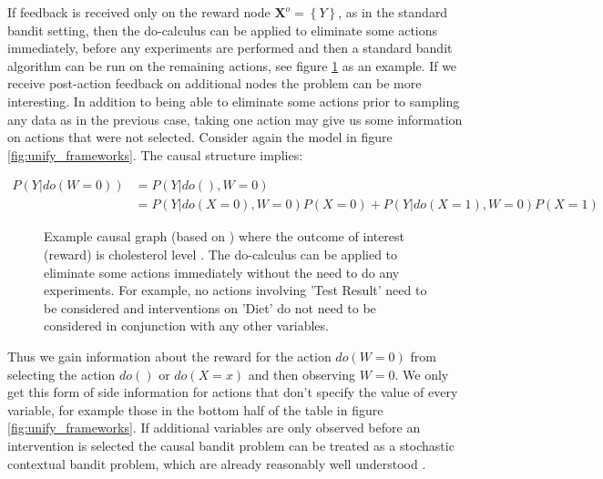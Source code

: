\documentclass[11pt,a4paper,oneside]{book}
\newcommand{\set}[1]{\left\{#1\right\}}
\newcommand{\eq}[1]{\begin{align*}#1\end{align*}}
\renewcommand{\vec}[1]{\boldsymbol{#1}}
\theoremstyle{plain}
\theoremstyle{definition}
\begin{document}
If feedback is received only on the reward node $\vec{X}^o = \set{Y}$, as in the standard bandit setting, then the do-calculus can be applied to eliminate some actions immediately, before any experiments are performed and then a standard bandit algorithm can be run on the remaining actions, see figure \ref{fig:cholesterol_graph} as an example. If we receive post-action feedback on additional nodes the problem can be more interesting. In addition to being able to eliminate some actions prior to sampling any data as in the previous case, taking one action may give us some information on actions that were not selected. Consider again the model in figure \ref{fig:unify_frameworks}. The causal structure implies: 

\eq{
P(Y|do(W = 0)) &= P(Y|do(),W = 0) \\
&= P(Y|do(X=0),W=0)P(X=0)+P(Y|do(X=1),W=0)P(X=1) 
}

\begin{figure}
\centering
{}
\caption{Example causal graph (based on \citet{Koller2009}) where the outcome of interest (reward) is cholesterol level . The do-calculus can be applied to eliminate some actions immediately without the need to do any experiments. For example, no actions involving 'Test Result' need to be considered and interventions on 'Diet' do not need to be considered in conjunction with any other variables.}
\label{fig:cholesterol_graph}
\end{figure}

Thus we gain information about the reward for the action $do(W=0)$ from selecting the action $do()$ or $do(X = x)$ and then observing $W = 0$.  We only get this form of side information for actions that don't specify the value of every variable, for example those in the bottom half of the table in figure \ref{fig:unify_frameworks}. If additional variables are only observed before an intervention is selected the causal bandit problem can be treated as a stochastic contextual bandit problem, which are already reasonably well understood \citep{Agarwal2014}.
\end{document}
